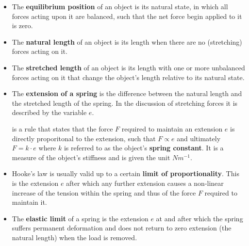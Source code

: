\begin{itemize}
	\item The \textbf{equilibrium position} of an object is its natural state, in which all forces acting upon it are balanced, such that the net force begin applied to it is zero.

	\item The \textbf{natural length} of an object is its length when there are no (stretching) forces acting on it. 

	\item The \textbf{stretched length} of an object is its length with one or more unbalanced forces acting on it that change the object's length relative to its natural state.

	\item The \textbf{extension of a spring} is the difference between the natural length and the stretched length of the spring. In the discussion of stretching forces it is described by the variable $e$.

	 is a rule that states that the force $F$ required to maintain an extension $e$ is directly proporitonal to the extension, such that $F \propto e$ and ultimately $F = k \cdot e$ where $k$ is referred to as the object's \textbf{spring constant}. It is a measure of the object's stiffness and is given the unit $N m^{-1}$.

	\item Hooke's law is usually valid up to a certain \textbf{limit of proportionality}. This is the extension $e$ after which any further extension causes a non-linear increase of the tension within the spring and thus of the force $F$ required to maintain it.

	\item The \textbf{elastic limit} of a spring is the extension $e$ at and after which the spring suffers permanent deformation and does not return to zero extension (the natural length) when the load is removed.
\end{itemize}

